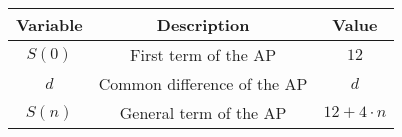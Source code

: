 \begin{tabular}[12.1pt]{ |c| c| c|}
    \hline
    \textbf{Variable} & \textbf{Description} &\textbf{Value}\\ 
    \hline
    $S(0)$ & First term of the AP & $12$ \\
    \hline 
    $d$ & Common difference of the AP &$d$ \\
    \hline 
    $S(n)$ & General term of the AP & $12+4\cdot n$\\
    \hline
    
    \end{tabular}
